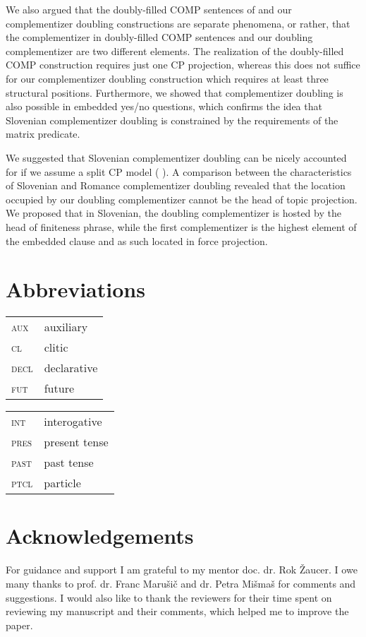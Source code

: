 \documentclass[output=paper,
]{langscibook}
\begin{document}
We also argued that the doubly-filled COMP sentences of \cite{Bacskai2016} and our complementizer doubling constructions are separate phenomena, or ra\-ther, that the complementizer in  doubly-filled COMP sentences and our doubling complementizer are two different elements. The realization of the doubly-filled COMP construction requires just one CP projection, whereas this does not suffice for our complementizer doubling construction which requires at least three structural positions. Furthermore, we showed that complementizer doubling is also possible in embedded yes/no questions, which confirms the idea that Slovenian complementizer doubling is constrained by the requirements of the matrix predicate. 

We suggested that Slovenian complementizer doubling can be nicely accounted for if we assume a split CP model (\citeauthor{rizzi1997} \citeyear{rizzi1997, rizzi2001}). A comparison between the characteristics of Slovenian and Romance complementizer doubling revealed that the location occupied by our doubling complementizer cannot be the head of topic projection. We proposed that in Slovenian, the doubling complementizer is hosted by the head of finiteness phrase, while the first complementizer is the highest element of the embedded clause and as such located in force projection.




\section*{Abbreviations}

\begin{tabularx}{.45\textwidth}{lX}
\textsc{aux}&auxiliary\\
\textsc{cl}&clitic\\
\textsc{decl}&declarative\\
\textsc{fut}&future\\
\end{tabularx}
\begin{tabularx}{.45\textwidth}{lX}
\textsc{int}&interogative\\
\textsc{pres}&present tense\\
\textsc{past}&past tense\\
\textsc{ptcl}&particle\\
\end{tabularx}

\section*{Acknowledgements}
For guidance and support I am grateful to my mentor doc. dr. Rok Žaucer. I owe many thanks to prof. dr. Franc Marušič and dr. Petra Mišmaš for comments and suggestions. I would also like to thank the reviewers for their time spent on reviewing my manuscript and their comments, which helped me to improve the paper.

\sloppy
\printbibliography[heading=subbibliography,notkeyword=this]
\end{document}
